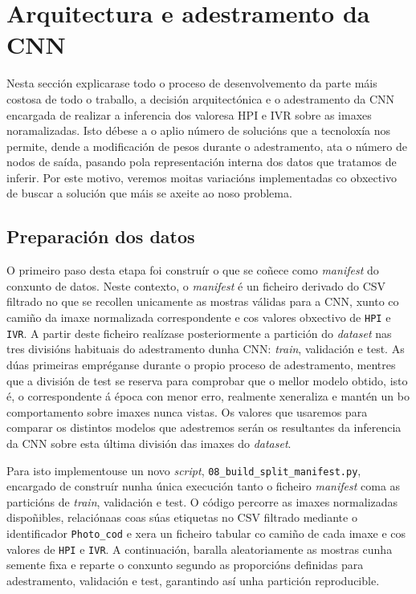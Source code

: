 \section{Arquitectura e adestramento da CNN}
Nesta sección explicarase todo o proceso de desenvolvemento da parte máis costosa de todo o traballo, a decisión arquitectónica e o adestramento
da CNN encargada de realizar a inferencia dos valoresa HPI e IVR sobre as imaxes noramalizadas. Isto débese a o aplio número de solucións
que a tecnoloxía nos permite, dende a modificación de pesos durante o adestramento, ata o número de nodos de saída, pasando pola representación
interna dos datos que tratamos de inferir. Por este motivo, veremos moitas variacións implementadas co obxectivo de buscar a solución
que máis se axeite ao noso problema.


\subsection{Preparación dos datos}
O primeiro paso desta etapa foi construír o que se coñece como \textit{manifest} do conxunto de
datos. Neste contexto, o \textit{manifest} é un ficheiro derivado do CSV filtrado no que se recollen
unicamente as mostras válidas para a CNN, xunto co camiño da imaxe normalizada correspondente e cos
valores obxectivo de \texttt{HPI} e \texttt{IVR}. A partir deste ficheiro realízase posteriormente a
partición do \textit{dataset} nas tres divisións habituais do adestramento dunha CNN:
\textit{train}, validación e test. As dúas primeiras empréganse durante o propio proceso de
adestramento, mentres que a división de test se reserva para comprobar que o mellor modelo
obtido, isto é, o correspondente á época con menor erro, realmente xeneraliza e mantén un bo
comportamento sobre imaxes nunca vistas. Os valores que usaremos para comparar os distintos modelos
que adestremos serán os resultantes da inferencia da CNN sobre esta última división das imaxes do
\textit{dataset}.

Para isto implementouse un novo \textit{script}, \texttt{08\_build\_split\_manifest.py}, encargado de
construír nunha única execución tanto o ficheiro \textit{manifest} coma as particións de
\textit{train}, validación e test. O código percorre as imaxes normalizadas dispoñibles, relaciónaas
coas súas etiquetas no CSV filtrado mediante o identificador \texttt{Photo\_cod} e xera un ficheiro
tabular co camiño de cada imaxe e cos valores de \texttt{HPI} e \texttt{IVR}. A continuación,
baralla aleatoriamente as mostras cunha semente fixa e reparte o conxunto segundo as proporcións
definidas para adestramento, validación e test, garantindo así unha partición reproducible.

